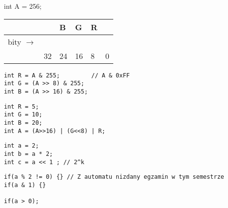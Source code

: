\documentclass[11pt]{article}
\begin{document}
\hline

\begin{lang}
int A = 256;
\end{lang}

\begin{center}
\begin{tabular}{l|l|l|l|l|l|}
 &  & B & G & R & \\
\hline
bity \(\to\) &  &  &  &  & \\
\hline
 & 32 & 24 & 16 & 8 & 0\\
\end{tabular}
\end{center}

\begin{verbatim}
int R = A & 255;         // A & 0xFF
int G = (A >> 8) & 255;
int B = (A >> 16) & 255;
\end{verbatim}

\hline

\begin{verbatim}
int R = 5;
int G = 10;
int B = 20;
int A = (A>>16) | (G<<8) | R;
\end{verbatim}

\hline

\begin{verbatim}
int a = 2;
int b = a * 2;
int c = a << 1 ; // 2^k
\end{verbatim}

\hline

\begin{verbatim}
if(a % 2 != 0) {} // Z automatu nizdany egzamin w tym semestrze
if(a & 1) {}

if(a > 0);
\end{verbatim}
\end{document}
